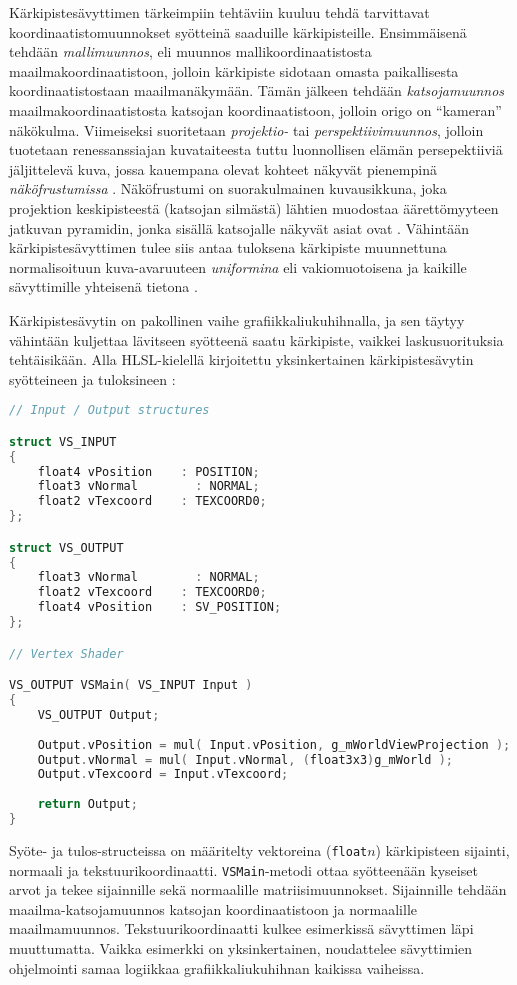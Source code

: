 \documentclass[finnish]{tktltiki2}
\theoremstyle{definition}
\theoremstyle{remark}
\begin{document}
Kärkipistesävyttimen tärkeimpiin tehtäviin kuuluu tehdä tarvittavat koordinaatistomuunnokset syötteinä saaduille kärkipisteille. Ensimmäisenä tehdään \emph{mallimuunnos}, eli muunnos mallikoordinaatistosta maailmakoordinaatistoon, jolloin kärkipiste sidotaan omasta paikallisesta koordinaatistostaan maailmanäkymään. Tämän jälkeen tehdään \emph{katsojamuunnos} maailmakoordinaatistosta katsojan koordinaatistoon, jolloin origo on ``kameran'' näkökulma. Viimeiseksi suoritetaan \emph{projektio-} tai \emph{perspektiivimuunnos}, jolloin tuotetaan renessanssiajan kuvataiteesta tuttu luonnollisen elämän persepektiiviä jäljittelevä kuva, jossa kauempana olevat kohteet näkyvät pienempinä \emph{näköfrustumissa} \cite[s. 386-389]{Puh08}. Näköfrustumi on suorakulmainen kuvausikkuna, joka projektion keskipisteestä (katsojan silmästä) lähtien muodostaa äärettömyyteen jatkuvan pyramidin, jonka sisällä katsojalle näkyvät asiat ovat \cite[s. 187-188]{Puh08}. Vähintään kärkipistesävyttimen tulee siis antaa tuloksena kärkipiste muunnettuna normalisoituun kuva-avaruuteen \emph{uniformina} eli vakiomuotoisena ja kaikille sävyttimille yhteisenä tietona \cite[s. 388]{Puh08}.

Kärkipistesävytin on pakollinen vaihe grafiikkaliukuhihnalla, ja sen täytyy vähintään kuljettaa lävitseen syötteenä saatu kärkipiste, vaikkei laskusuorituksia tehtäisikään. Alla HLSL-kielellä kirjoitettu yksinkertainen kärkipistesävytin syötteineen ja tuloksineen \cite{Mic11}:

\lstset{breaklines=true}
\begin{lstlisting}[language=c, basicstyle=\footnotesize]
// Input / Output structures

struct VS_INPUT
{
    float4 vPosition    : POSITION;
    float3 vNormal        : NORMAL;
    float2 vTexcoord    : TEXCOORD0;
};

struct VS_OUTPUT
{
    float3 vNormal        : NORMAL;
    float2 vTexcoord    : TEXCOORD0;
    float4 vPosition    : SV_POSITION;
};

// Vertex Shader

VS_OUTPUT VSMain( VS_INPUT Input )
{
    VS_OUTPUT Output;
    
    Output.vPosition = mul( Input.vPosition, g_mWorldViewProjection );
    Output.vNormal = mul( Input.vNormal, (float3x3)g_mWorld );
    Output.vTexcoord = Input.vTexcoord;
    
    return Output;
}
\end{lstlisting}

Syöte- ja tulos-structeissa on määritelty vektoreina (\texttt{float}$n$) kärkipisteen sijainti, normaali ja tekstuurikoordinaatti. \texttt{VSMain}-metodi ottaa syötteenään kyseiset arvot  ja tekee sijainnille sekä normaalille matriisimuunnokset. Sijainnille tehdään maailma-katsojamuunnos katsojan koordinaatistoon ja normaalille maailmamuunnos. Tekstuurikoordinaatti kulkee esimerkissä sävyttimen läpi muuttumatta. Vaikka esimerkki on yksinkertainen, noudattelee sävyttimien ohjelmointi samaa logiikkaa grafiikkaliukuhihnan kaikissa vaiheissa.
\end{document}
